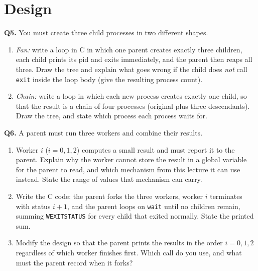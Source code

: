 \documentclass[11pt]{article}
\begin{document}
\section{Design}

\textbf{Q5.} You must create three child processes in two different shapes.
\begin{enumerate}
  \item[(a)] \emph{Fan:} write a loop in C in which one parent creates exactly three children, each child prints its pid and exits immediately, and the parent then reaps all three. Draw the tree and explain what goes wrong if the child does \emph{not} call \texttt{exit} inside the loop body (give the resulting process count).
  \item[(b)] \emph{Chain:} write a loop in which each new process creates exactly one child, so that the result is a chain of four processes (original plus three descendants). Draw the tree, and state which process each process waits for.
\end{enumerate}

\textbf{Q6.} A parent must run three workers and combine their results.
\begin{enumerate}
  \item[(a)] Worker $i$ ($i = 0, 1, 2$) computes a small result and must report it to the parent. Explain why the worker cannot store the result in a global variable for the parent to read, and which mechanism from this lecture it can use instead. State the range of values that mechanism can carry.
  \item[(b)] Write the C code: the parent forks the three workers, worker $i$ terminates with status $i+1$, and the parent loops on \texttt{wait} until no children remain, summing \texttt{WEXITSTATUS} for every child that exited normally. State the printed sum.
  \item[(c)] Modify the design so that the parent prints the results in the order $i = 0, 1, 2$ regardless of which worker finishes first. Which call do you use, and what must the parent record when it forks?
\end{enumerate}



\end{document}
